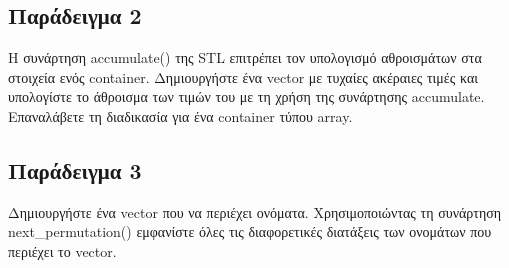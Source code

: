 




\subsection{Παράδειγμα 2}
Η συνάρτηση accumulate() της STL επιτρέπει τον υπολογισμό αθροισμάτων στα στοιχεία ενός container. Δημιουργήστε ένα vector με τυχαίες ακέραιες τιμές και υπολογίστε το άθροισμα των τιμών του με τη χρήση της συνάρτησης accumulate. Επαναλάβετε τη διαδικασία για ένα container τύπου array.





\subsection{Παράδειγμα 3}
Δημιουργήστε ένα vector που να περιέχει ονόματα. Χρησιμοποιώντας τη συνάρτηση next\_permutation() εμφανίστε όλες τις διαφορετικές διατάξεις των ονομάτων που περιέχει το vector.



